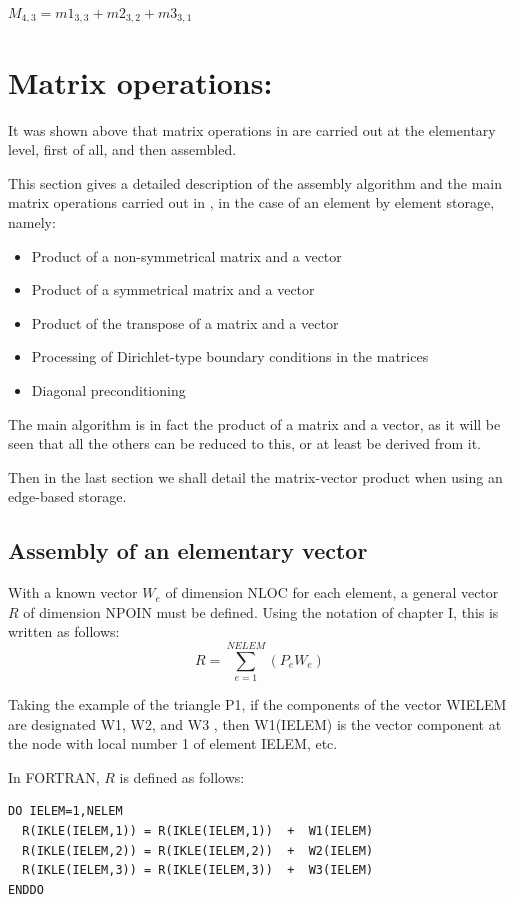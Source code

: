 $M_{4,3} = m1_{3,3} + m2_{3,2} + m3_{3,1}$

\section{Matrix operations:}
\label{ref:matrixoperations}

It was shown above that matrix operations in \bief are carried out at the elementary
level, first of all, and then assembled.

This section gives a detailed description of the assembly algorithm and the
main matrix operations carried out in \bief, in the case of an element by
element storage, namely:
\begin{itemize}
  \item Product of a non-symmetrical matrix and a vector
  \item Product of a symmetrical matrix and a vector
  \item Product of the transpose of a matrix and a vector
  \item Processing of Dirichlet-type boundary conditions in the matrices
  \item Diagonal preconditioning
\end{itemize}

The main algorithm is in fact the product of a matrix and a vector, as it will
be seen that all the others can be reduced to this, or at least be derived from
it.

Then in the last section we shall detail the matrix-vector product when using
an edge-based storage.

\subsection{Assembly of an elementary vector}

With a known vector $W_e$ of dimension NLOC for each element, a general vector $R$
of dimension NPOIN must be defined. Using the notation of chapter I, this is
written as follows:
\[R=\sum _{e=1}^{NELEM}(P_{e} W_{e} ) \]

Taking the example of the triangle P1, if the components of the vector WIELEM
are designated W1, W2, and W3 , then W1(IELEM) is the vector component at the
node with local number 1 of element IELEM, etc.

In FORTRAN, $R$ is defined as follows:

\begin{lstlisting}[language=TelFortran]
DO IELEM=1,NELEM
  R(IKLE(IELEM,1)) = R(IKLE(IELEM,1))  +  W1(IELEM)
  R(IKLE(IELEM,2)) = R(IKLE(IELEM,2))  +  W2(IELEM)
  R(IKLE(IELEM,3)) = R(IKLE(IELEM,3))  +  W3(IELEM)
ENDDO
\end{lstlisting}

